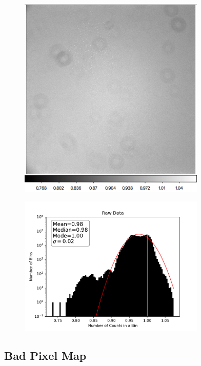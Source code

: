 \documentclass[preprint]{aastex62}
\begin{document}
        \begin{figure}
          \centering
            \includegraphics[width=3.5in]{../images/flat_master_r90.png}
            \caption{}
          \label{fig:flat_master-r90}
        \end{figure}
        \begin{figure}
          \centering
            \includegraphics[width=3.5in]{../images/flat_master_raw_r90.pdf}
            \caption{}
          \label{fig:flat_masterhisto_r90}
        \end{figure}
    
  \subsection{Bad Pixel Map}
  
\end{document}

